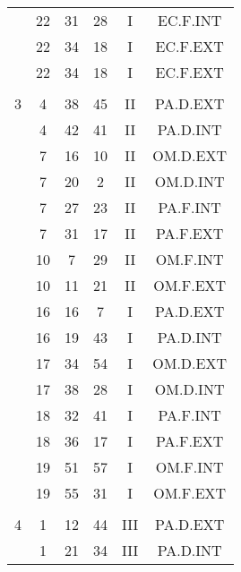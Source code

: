 \documentclass[12pt, a4paper]{article}
\begin{document}
\begin{multicols}{3}
{\begin{tabular}{c c c c c c}
	 	 	 	 & 22 & 31 & 28 & I & EC.F.INT\\%
	 	 	 	 & 22 & 34 & 18 & I & EC.F.EXT\\%
	 	 	 	 & 22 & 34 & 18 & I & EC.F.EXT\\%
	 	 	 	 & & & & & \\%
	 	 	 	3 & 4 & 38 & 45 & II & PA.D.EXT\\%
	 	 	 	 & 4 & 42 & 41 & II & PA.D.INT\\%
	 	 	 	 & 7 & 16 & 10 & II & OM.D.EXT\\%
	 	 	 	 & 7 & 20 & 2 & II & OM.D.INT\\%
	 	 	 	 & 7 & 27 & 23 & II & PA.F.INT\\%
	 	 	 	 & 7 & 31 & 17 & II & PA.F.EXT\\%
	 	 	 	 & 10 & 7 & 29 & II & OM.F.INT\\%
	 	 	 	 & 10 & 11 & 21 & II & OM.F.EXT\\%
	 	 	 	 & 16 & 16 & 7 & I & PA.D.EXT\\%
	 	 	 	 & 16 & 19 & 43 & I & PA.D.INT\\%
	 	 	 	 & 17 & 34 & 54 & I & OM.D.EXT\\%
	 	 	 	 & 17 & 38 & 28 & I & OM.D.INT\\%
	 	 	 	 & 18 & 32 & 41 & I & PA.F.INT\\%
	 	 	 	 & 18 & 36 & 17 & I & PA.F.EXT\\%
	 	 	 	 & 19 & 51 & 57 & I & OM.F.INT\\%
	 	 	 	 & 19 & 55 & 31 & I & OM.F.EXT\\%
	 	 	 	 & & & & & \\%
	 	 	 	4 & 1 & 12 & 44 & III & PA.D.EXT\\%
	 	 	 	 & 1 & 21 & 34 & III & PA.D.INT\\%

\end{tabular}}
\end{multicols}
\end{document}
